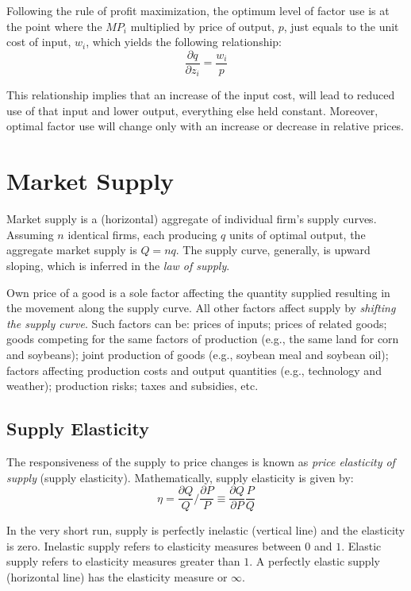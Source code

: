 \documentclass[
]{book}
\begin{document}
Following the rule of profit maximization, the optimum level of factor use is at the point where the \(MP_i\) multiplied by price of output, \(p\), just equals to the unit cost of input, \(w_i\), which yields the following relationship:\[\frac{\partial q}{\partial z_i} = \frac{w_i}{p}\]

This relationship implies that an increase of the input cost, will lead to reduced use of that input and lower output, everything else held constant. Moreover, optimal factor use will change only with an increase or decrease in relative prices.

\hypertarget{market-supply}{%
\section{Market Supply}\label{market-supply}}

Market supply is a (horizontal) aggregate of individual firm's supply curves. Assuming \(n\) identical firms, each producing \(q\) units of optimal output, the aggregate market supply is \(Q = nq\). The supply curve, generally, is upward sloping, which is inferred in the \emph{law of supply}.

Own price of a good is a sole factor affecting the quantity supplied resulting in the movement along the supply curve. All other factors affect supply by \emph{shifting the supply curve}. Such factors can be: prices of inputs; prices of related goods; goods competing for the same factors of production (e.g., the same land for corn and soybeans); joint production of goods (e.g., soybean meal and soybean oil); factors affecting production costs and output quantities (e.g., technology and weather); production risks; taxes and subsidies, etc.

\hypertarget{supply-elasticity}{%
\subsection{Supply Elasticity}\label{supply-elasticity}}

The responsiveness of the supply to price changes is known as \emph{price elasticity of supply} (supply elasticity). Mathematically, supply elasticity is given by: \[\eta = \frac{\partial Q}{Q}/\frac{\partial P}{P} \equiv \frac{\partial Q}{\partial P}\frac{P}{Q}\]

In the very short run, supply is perfectly inelastic (vertical line) and the elasticity is zero. Inelastic supply refers to elasticity measures between \(0\) and \(1\). Elastic supply refers to elasticity measures greater than \(1\). A perfectly elastic supply (horizontal line) has the elasticity measure or \(\infty\).
\end{document}
